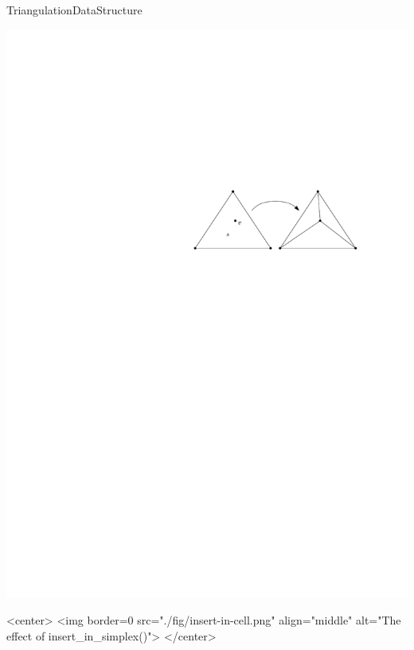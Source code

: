 \begin{ccRefConcept}{TriangulationDataStructure}
\begin{ccAdvanced}
\end{ccAdvanced}


\begin{ccTexOnly}
\begin{center}
\includegraphics{Triangulation_ref/fig/insert-in-cell.pdf}
\end{center}
\end{ccTexOnly}
\begin{ccHtmlOnly}
<center>
<img border=0 src="./fig/insert-in-cell.png" align="middle" alt="The effect of insert_in_simplex()">
</center>
\end{ccHtmlOnly}


\end{ccRefConcept}

